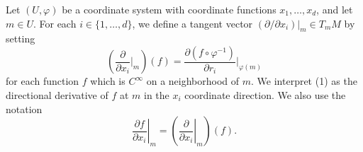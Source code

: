 \begin{definition}\label{thm:1.19}
	Let $(U,\varphi)$ be a coordinate system with coordinate functions $x_{1},\ldots,x_{d}$, and let $m\in U$. For each $i\in\{1,\ldots,d\}$, we define a tangent vector  $ (\partial/\partial x_i)|_{m} \in T_{m} M $ by setting
	\begin{equation}
		\tag{1}\label{eq:1.19:1}
		\left(\frac{\partial}{\partial x_{i}}\bigg\vert_{m}\right)(f)=\frac{\partial(f\circ\varphi^{-1})}{\partial r_{i}}\bigg\vert_{\varphi(m)}
	\end{equation}
	for each function $f$ which is $C^{\infty}$ on a neighborhood of $m$. We interpret (1) as the directional derivative of $f$ at $m$ in the $x_{i}$ coordinate direction. We also use the notation
	\begin{equation}
		\tag{2}\label{eq:1.19:2}
		\left.\frac{\partial f}{\partial x_{i}}\right|_{m}=\left(\left.\frac{\partial}{\partial x_{i}}\right|_{m}\right)(f).
	\end{equation}
	\begin{center}
	\end{center}

\end{definition}

